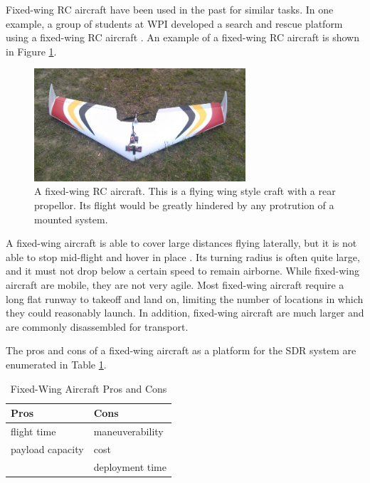 Fixed-wing RC aircraft have been used in the past for similar tasks. In one example, a group of students at WPI developed a search and rescue platform using a fixed-wing RC aircraft \cite{airplane_iqp}. An example of a fixed-wing RC aircraft is shown in Figure \ref{fig:fixed_wing}.
\begin{figure}[ht]
\centering
\includegraphics[width=0.70\textwidth]{img/fixed-wing.jpg}
\caption{A fixed-wing RC aircraft. This is a flying wing style craft with a rear propellor. Its flight would be greatly hindered by any protrution of a mounted system.}
\label{fig:fixed_wing}
\end{figure}\par
A fixed-wing aircraft is able to cover large distances flying laterally, but it is not able to stop mid-flight and hover in place \cite{airplane_book}. Its turning radius is often quite large, and it must not drop below a certain speed to remain airborne. While fixed-wing aircraft are mobile, they are not very agile. Most fixed-wing aircraft require a long flat runway to takeoff and land on, limiting the number of locations in which they could reasonably launch. In addition, fixed-wing aircraft are much larger and are commonly disassembled for transport.\par
The pros and cons of a fixed-wing aircraft as a platform for the SDR system are enumerated in Table \ref{table:wing_pc}.
\begin{table}[ht]
\centering
\caption{Fixed-Wing Aircraft Pros and Cons}
\label{table:wing_pc}
\begin{tabular}{l|l}
  Pros & Cons \\ \hline
  flight time & maneuverability \\
  payload capacity & cost \\
   & deployment time \\
\end{tabular}
\end{table}\par

